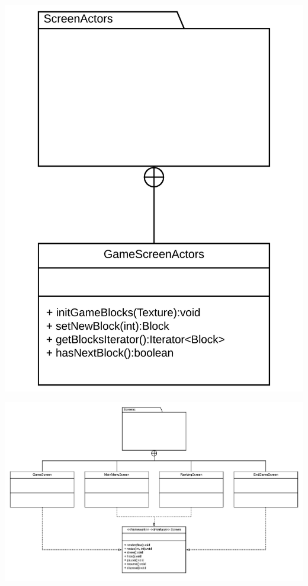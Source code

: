 \documentclass{article}
\begin{document}
\begin{center}
    \includegraphics[scale=0.1]{actors.png}
\end{center}

\begin{center}
    \includegraphics[scale=0.3]{screens.png}
\end{center}
\end{document}
